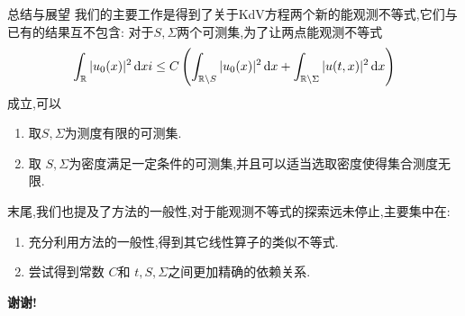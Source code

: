 \iffalse
\begin{frame}[t]{进一步地思考}
  我们已经对于可测集和部分无限测度的集合建立了能观测不等式,但是从我们的方法上看,我们给的条件并不够本质.也就是说,应该可以把条件放宽到更一般的情形,这就是我们下一步努力的目标.
  \begin{center}
   \Huge\bf 谢谢!
  \end{center}
\end{frame}
\fi

\begin{frame}[t]{总结与展望}
  我们的主要工作是得到了关于KdV方程两个新的能观测不等式,它们与已有的结果互不包含:
  对于$S,\Sigma$两个可测集,为了让两点能观测不等式
   \[
     \int_{\mathbb{R}}|u_0(x)|^2 \,\mathrm{d}xi\le C\left( \int_{\mathbb{R}\backslash S}|u_0(x)|^2\,\mathrm{d}x+\int_{\mathbb{R}\backslash  \Sigma}|u(t,x)|^2\,\mathrm{d}x \right) 
  \] 
  成立,可以
  \begin{enumerate}
    \item 取$S,\Sigma$为测度有限的可测集.
    \item 取 $S,\Sigma$为密度满足一定条件的可测集,并且可以适当选取密度使得集合测度无限.
  \end{enumerate}
  末尾,我们也提及了方法的一般性,对于能观测不等式的探索远未停止,主要集中在:
  \begin{enumerate}
    \item 充分利用方法的一般性,得到其它线性算子的类似不等式.
    \item 尝试得到常数 $C$和 $t,S,\Sigma$之间更加精确的依赖关系.
  \end{enumerate}
\end{frame}

\begin{frame}
  \begin{center}
    \Huge\bf 谢谢!
  \end{center}
\end{frame}
